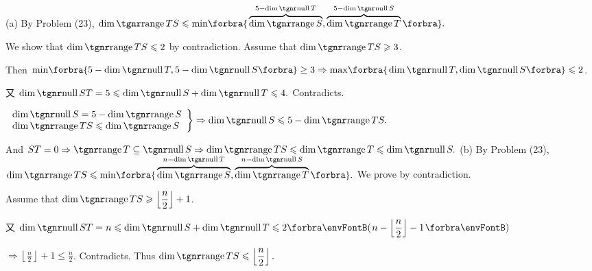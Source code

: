 \documentclass[a4paper, 11pt, UTF8]{article}
\begin{document}
\begin{large}
\par\quad
(a) By Problem (23), $\dim\range TS\leqslant\min\!\Bra{\overbrace{\dim \range S}^{5-\dim\null T}, \overbrace{\dim\range T}^{5-\dim\null S}}.$\par\quad\Ha
We show that $\dim\range TS\leqslant 2$ by contradiction. Assume that $\dim\range TS\geqslant 3$.\par\quad\Ha
Then $\min\!\Bra{5-\dim\null T,5-\dim\null S}\geq 3\Rightarrow\max\!\Bra{\dim\null T,\dim\null S}\leqslant 2$.\par\quad\Ha
又 $\dim\null ST=5\leqslant\dim\null S+\dim\null T\leqslant 4.$ Contradicts.\vspace{8pt}\par\quad\Ha
\Or $\MathRightBrace{l}{\dim\null S=5-\dim\range S\\ \dim\range TS\leqslant\dim\range S}\Rightarrow\dim\null S\leqslant 5-\dim\range TS.$\par\vspace{6pt}\quad\Ha
And $ST=0\Rightarrow\range T\subseteq\null S\Rightarrow\dim\range TS\leqslant\dim\range T\leqslant\dim\null S.$\PfEnd\vspace{10pt}\quad
(b) By Problem (23), $\dim\range TS\leqslant\min\!\Bra{\overbrace{\dim \range S}^{n-\dim\null T}, \overbrace{\dim\range T}^{n-\dim\null S}}.$ We prove by contradiction.\par\quad\Hb
Assume that $\dim\range TS\geqslant \left\lfloor\displaystyle\frac{n}{2}\right\rfloor+1$.\par\quad\Hb
{}\par\quad\Hb
又 $\dim\null ST=n\leqslant\dim\null S+\dim\null T\leqslant 2\Par{n-\left\lfloor\displaystyle\frac{n}{2}\right\rfloor-1}$\par\quad\Hb
$\Rightarrow \left\lfloor\displaystyle\frac{n}{2}\right\rfloor+1\leqslant\displaystyle\frac{n}{2}$. Contradicts. Thus $\dim\range TS\leqslant \left\lfloor\displaystyle\frac{n}{2}\right\rfloor.$\PfEnd\vspace{15pt}\quad\Hb

\end{large}
\end{document}
